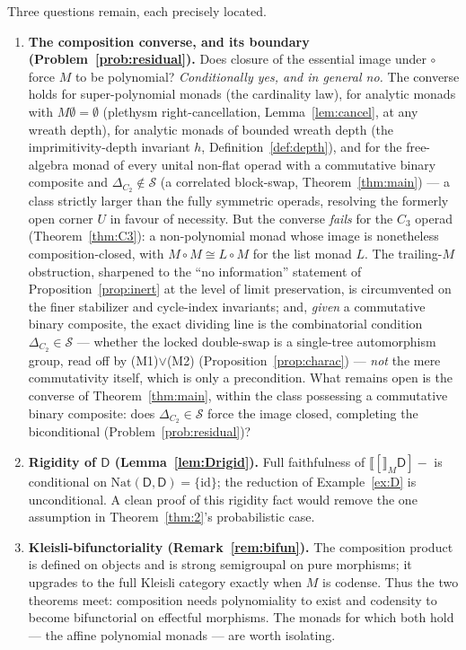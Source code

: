 \documentclass[11pt]{amsart}
\theoremstyle{plain}
\theoremstyle{definition}
\newcommand{\Nat}{\mathrm{Nat}}
\newcommand{\extM}[1]{\llbracket #1 \rrbracket_{M}}
\newcommand{\id}{\mathrm{id}}
\newcommand{\D}{\mathsf{D}}
\begin{document}
Three questions remain, each precisely located.
\begin{enumerate}[label=(\arabic*)]
\item \textbf{The composition converse, and its boundary (Problem~\ref{prob:residual}).} Does closure of
  the essential image under $\circ$ force $M$ to be polynomial? \emph{Conditionally yes, and in general
  no.} The converse holds for super-polynomial monads (the cardinality law), for analytic monads with
  $M\emptyset=\emptyset$ (plethysm right-cancellation, Lemma~\ref{lem:cancel}, at any wreath depth), for
  analytic monads of bounded wreath depth (the imprimitivity-depth invariant $h$,
  Definition~\ref{def:depth}), and for the free-algebra monad of every unital non-flat operad with a
  commutative binary composite and $\Delta_{C_2}\notin\mathcal S$ (a correlated block-swap,
  Theorem~\ref{thm:main}) --- a class strictly larger than the fully symmetric operads, resolving the
  formerly open corner $U$ in favour of necessity. But the converse \emph{fails} for the $C_3$ operad
  (Theorem~\ref{thm:C3}): a non-polynomial monad whose image is nonetheless composition-closed, with
  $M\circ M\cong L\circ M$ for the list monad $L$. The trailing-$M$ obstruction, sharpened to the ``no
  information'' statement of Proposition~\ref{prop:inert} at the level of limit preservation, is
  circumvented on the finer stabilizer and cycle-index invariants; and, \emph{given} a commutative binary
  composite, the exact dividing line is the combinatorial condition $\Delta_{C_2}\in\mathcal S$ --- whether
  the locked double-swap is a single-tree automorphism group, read off by (M1)$\vee$(M2)
  (Proposition~\ref{prop:charac}) --- \emph{not} the mere commutativity itself, which is only a
  precondition. What remains open is the converse of Theorem~\ref{thm:main}, within the class possessing a
  commutative binary composite: does $\Delta_{C_2}\in\mathcal S$ force the image closed, completing the
  biconditional (Problem~\ref{prob:residual})?
\item \textbf{Rigidity of $\D$ (Lemma~\ref{lem:Drigid}).} Full faithfulness of $\extM[\D]{-}$ is
  conditional on $\Nat(\D,\D)=\{\id\}$; the reduction of Example~\ref{ex:D} is unconditional. A clean
  proof of this rigidity fact would remove the one assumption in Theorem~\ref{thm:2}'s probabilistic
  case.
\item \textbf{Kleisli-bifunctoriality (Remark~\ref{rem:bifun}).} The composition product is defined on
  objects and is strong semigroupal on pure morphisms; it upgrades to the full Kleisli category
  exactly when $M$ is codense. Thus the two theorems meet: composition needs polynomiality to exist
  and codensity to become bifunctorial on effectful morphisms. The monads for which both hold --- the
  affine polynomial monads --- are worth isolating.
\end{enumerate}
\end{document}
